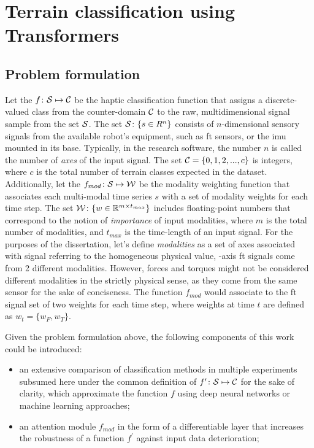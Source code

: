 \documentclass[a4paper, 10pt, twoside]{report}
\begin{document}
\section{Terrain classification using Transformers}
\label{part:methods:terrain:haptr}

\subsection{Problem formulation}
\label{part:methods:terrain:haptr:problem}

Let the $f \colon {\cal S} \mapsto {\cal C}$ be the haptic classification function that assigns a discrete-valued class from the counter-domain ${\cal C}$ to the raw, multidimensional signal sample from the set ${\cal S}$. The set ${\cal S} \colon \{s \in R^{n}\}$ consists of $n$-dimensional sensory signals from the available robot's equipment, such as \acrshort{ft} sensors, or the \acrshort{imu} mounted in its base. Typically, in the research software, the number $n$ is called the number of \textit{axes} of the input signal. The set ${\cal C} = \{0, 1, 2, ..., c\}$ is integers, where $c$ is the total number of terrain classes expected in the dataset. Additionally, let the $f_{mod} \colon {\cal S} \mapsto {\cal W}$ be the modality weighting function that associates each multi-modal time series $s$ with a set of modality weights for each time step. The set ${\cal W} \colon \{w \in \mathbb{R}^{m \times t_{max}}\}$ includes floating-point numbers that correspond to the notion of \textit{importance} of input modalities, where $m$ is the total number of modalities, and $t_{max}$ is the time-length of an input signal. For the purposes of the dissertation, let's define \textit{modalities} as a set of axes associated with signal referring to the homogeneous physical value, -axis \acrshort{ft} signals come from 2 different modalities. However, forces and torques might not be considered different modalities in the strictly physical sense, as they come from the same sensor for the sake of conciseness. The function $f_{mod}$ would associate to the \acrshort{ft} signal set of two weights for each time step, where weights at time $t$ are defined as $w_{t} = \{w_F, w_T\}$.

Given the problem formulation above, the following components of this work could be introduced:

\begin{itemize}
    \item an extensive comparison of classification methods in multiple experiments subsumed here under the common definition of $f^{\prime} \colon {\cal S} \mapsto {\cal C}$ for the sake of clarity, which approximate the function $f$ using deep neural networks or machine learning approaches;
    \item an attention module $f_{mod}$ in the form of a differentiable layer that increases the robustness of a function $f^{\prime}$ against input data deterioration;
\end{itemize}
\end{document}
